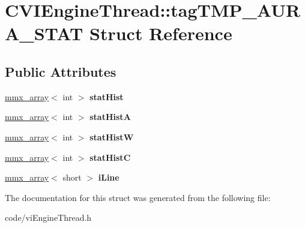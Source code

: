 \hypertarget{struct_c_v_i_engine_thread_1_1tag_t_m_p___a_u_r_a___s_t_a_t}{\section{C\+V\+I\+Engine\+Thread\+:\+:tag\+T\+M\+P\+\_\+\+A\+U\+R\+A\+\_\+\+S\+T\+A\+T Struct Reference}
\label{struct_c_v_i_engine_thread_1_1tag_t_m_p___a_u_r_a___s_t_a_t}
}
\subsection*{Public Attributes}
\begin{DoxyCompactItemize}
\item 
\hypertarget{struct_c_v_i_engine_thread_1_1tag_t_m_p___a_u_r_a___s_t_a_t_a1259267e7d38e77653ece8e1c5bb63a9}{\hyperlink{classmmx__array}{mmx\+\_\+array}$<$ int $>$ {\bfseries stat\+Hist}}\label{struct_c_v_i_engine_thread_1_1tag_t_m_p___a_u_r_a___s_t_a_t_a1259267e7d38e77653ece8e1c5bb63a9}

\item 
\hypertarget{struct_c_v_i_engine_thread_1_1tag_t_m_p___a_u_r_a___s_t_a_t_aa9dff3136c04a571f82c5d15deeca370}{\hyperlink{classmmx__array}{mmx\+\_\+array}$<$ int $>$ {\bfseries stat\+Hist\+A}}\label{struct_c_v_i_engine_thread_1_1tag_t_m_p___a_u_r_a___s_t_a_t_aa9dff3136c04a571f82c5d15deeca370}

\item 
\hypertarget{struct_c_v_i_engine_thread_1_1tag_t_m_p___a_u_r_a___s_t_a_t_a0bb0bffd8702d64bca468c48409afc4d}{\hyperlink{classmmx__array}{mmx\+\_\+array}$<$ int $>$ {\bfseries stat\+Hist\+W}}\label{struct_c_v_i_engine_thread_1_1tag_t_m_p___a_u_r_a___s_t_a_t_a0bb0bffd8702d64bca468c48409afc4d}

\item 
\hypertarget{struct_c_v_i_engine_thread_1_1tag_t_m_p___a_u_r_a___s_t_a_t_aba2ac6a4a2f4096c664860c7e600b890}{\hyperlink{classmmx__array}{mmx\+\_\+array}$<$ int $>$ {\bfseries stat\+Hist\+C}}\label{struct_c_v_i_engine_thread_1_1tag_t_m_p___a_u_r_a___s_t_a_t_aba2ac6a4a2f4096c664860c7e600b890}

\item 
\hypertarget{struct_c_v_i_engine_thread_1_1tag_t_m_p___a_u_r_a___s_t_a_t_afbc1d96e6f8f6ffcdd008147e7702e2f}{\hyperlink{classmmx__array}{mmx\+\_\+array}$<$ short $>$ {\bfseries i\+Line}}\label{struct_c_v_i_engine_thread_1_1tag_t_m_p___a_u_r_a___s_t_a_t_afbc1d96e6f8f6ffcdd008147e7702e2f}

\end{DoxyCompactItemize}


The documentation for this struct was generated from the following file\+:\begin{DoxyCompactItemize}
\item 
code/vi\+Engine\+Thread.\+h\end{DoxyCompactItemize}
